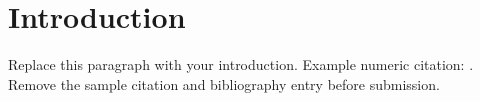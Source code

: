 \section{Introduction}

Replace this paragraph with your introduction. Example numeric citation: \parencite{sample2026}. Remove the sample citation and bibliography entry before submission.

\lipsum[1-3]